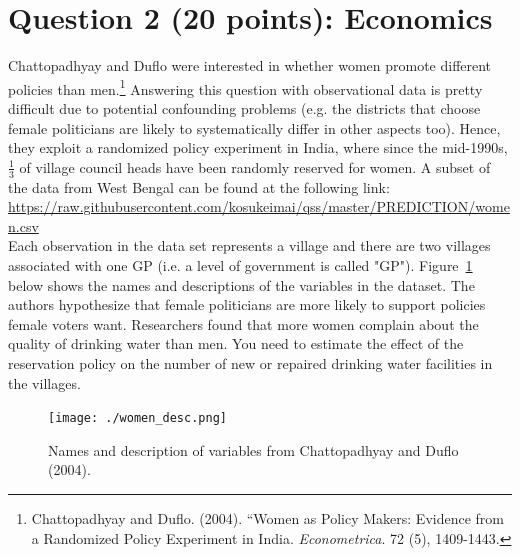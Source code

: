 \documentclass[12pt,letterpaper]{article}
\begin{document}
\section*{Question 2 (20 points): Economics}
Chattopadhyay and Duflo were interested in whether women promote different policies than men.\footnote{Chattopadhyay and Duflo. (2004). ``Women as Policy Makers: Evidence from a Randomized Policy Experiment in India. \textit{Econometrica}. 72 (5), 1409-1443.} Answering this question with observational data is pretty difficult due to potential confounding problems (e.g. the districts that choose female politicians are likely to systematically differ in other aspects too). Hence, they exploit a randomized policy experiment in India, where since the mid-1990s, $\frac{1}{3}$ of village council heads have been randomly reserved for women. A subset of the data from West Bengal can be found at the following link: \url{https://raw.githubusercontent.com/kosukeimai/qss/master/PREDICTION/women.csv}\\

\noindent Each observation in the data set represents a village and there are two villages associated with one GP (i.e. a level of government is called "GP"). Figure~\ref{fig:women_desc} below shows the names and descriptions of the variables in the dataset. The authors hypothesize that female politicians are more likely to support policies female voters want. Researchers found that more women complain about the quality of drinking water than men. You need to estimate the effect of the reservation policy on the number of new or repaired drinking water facilities in the villages.
\vspace{.5cm}
\begin{figure}[h!]
	\caption{\footnotesize{Names and description of variables from Chattopadhyay and Duflo (2004).}}
	\vspace{.5cm}
	\centering
	\label{fig:women_desc}
	\texttt{[image: ./women\_desc.png]}
\end{figure}		
\end{document}
